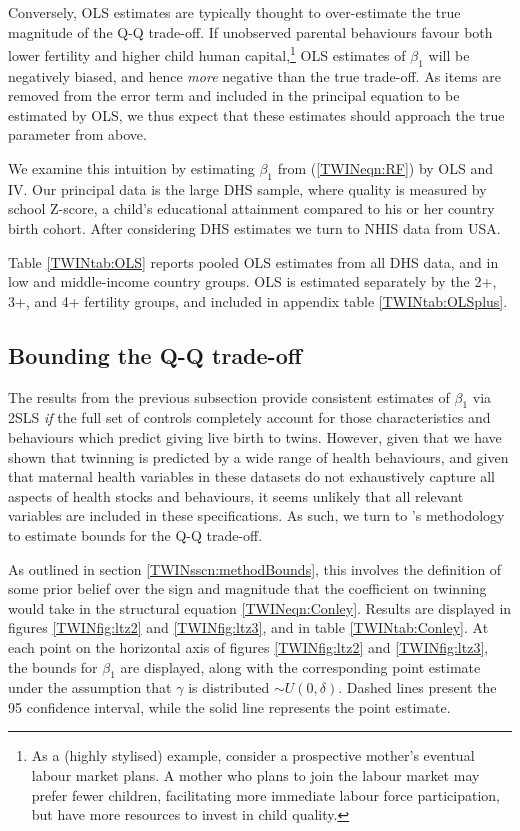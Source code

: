\documentclass[subeqn]{article}
\begin{document}
\begin{spacing}{1.4}
Conversely, OLS estimates are typically thought to over-estimate the true 
magnitude of the Q-Q trade-off.  If unobserved parental behaviours favour both
lower fertility and higher child human capital,\footnote{As a (highly stylised) 
example, consider a prospective mother's eventual labour market plans. A mother 
who plans to join the labour market may prefer fewer children, facilitating more 
immediate labour force participation, but have more resources to invest in child
quality.} OLS estimates of $\beta_1$ will be negatively biased, and hence 
\emph{more} negative than the true trade-off.  As items are removed from the
error term and included in the principal equation to be estimated by OLS, we thus 
expect that these estimates should approach the true parameter from above.

We examine this intuition by estimating $\beta_1$ from (\ref{TWINeqn:RF}) by OLS 
and IV. Our principal data is the large DHS sample, where quality is measured by
school Z-score, a child's educational attainment compared to his or her country
birth cohort.  After considering DHS estimates we turn to NHIS data from USA.

Table \ref{TWINtab:OLS} reports pooled OLS estimates from all DHS data, and in 
low and middle-income country groups. OLS is estimated separately by the 2+, 3+,
and 4+ fertility groups, and included in appendix table \ref{TWINtab:OLSplus}.


\subsection{Bounding the Q-Q trade-off}            \label{TWINsscn:resultBounds}
The results from the previous subsection provide consistent estimates of 
$\beta_1$ via 2SLS \emph{if} the full set of controls completely account for 
those characteristics and behaviours which predict giving live birth to twins. 
However, given that we have shown that twinning is predicted by a wide range of 
health behaviours, and given that maternal health variables in these datasets 
do not exhaustively capture all aspects of health stocks and behaviours, it seems 
unlikely that all relevant variables are included in these specifications. As 
such, we turn to \citeauthor{Conleyetal2012}'s \citeyear{Conleyetal2012} 
methodology to estimate bounds for the Q-Q trade-off.  

As outlined in section \ref{TWINsscn:methodBounds}, this involves the definition 
of some prior belief over the sign and magnitude that the coefficient on twinning 
would take in the structural equation \ref{TWINeqn:Conley}. Results are displayed 
in figures \ref{TWINfig:ltz2} and \ref{TWINfig:ltz3}, and in table 
\ref{TWINtab:Conley}. At each point on the horizontal axis of figures 
\ref{TWINfig:ltz2} and \ref{TWINfig:ltz3}, the bounds for $\beta_1$ are 
displayed, along with the corresponding point estimate under the assumption that 
$\gamma$ is distributed $\sim U(0,\delta)$. Dashed lines present the 95%
confidence interval, while the solid line represents the point estimate.



\end{spacing}
\end{document}
